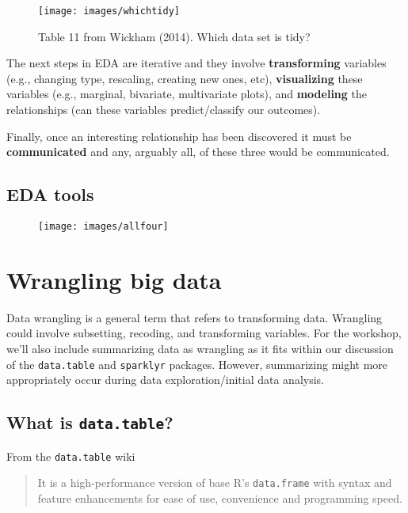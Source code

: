 \documentclass[
]{book}
\begin{document}
\begin{figure}
\texttt{[image: images/whichtidy]} \caption{Table 11 from Wickham (2014). Which data set is tidy?}\label{fig:tidypic}
\end{figure}

The next steps in EDA are iterative and they involve \textbf{transforming} variables (e.g., changing type, rescaling, creating new ones, etc), \textbf{visualizing} these variables (e.g., marginal, bivariate, multivariate plots), and \textbf{modeling} the relationships (can these variables predict/classify our outcomes).

Finally, once an interesting relationship has been discovered it must be \textbf{communicated} and any, arguably all, of these three would be communicated.

\hypertarget{eda-tools}{%
\section{EDA tools}\label{eda-tools}}

\begin{figure}
\texttt{[image: images/allfour]} \end{figure}

\hypertarget{wrangling-big-data}{%
\chapter{Wrangling big data}\label{wrangling-big-data}}

Data wrangling is a general term that refers to transforming data. Wrangling could involve subsetting, recoding, and transforming variables. For the workshop, we'll also include summarizing data as wrangling as it fits within our discussion of the \texttt{data.table} and \texttt{sparklyr} packages. However, summarizing might more appropriately occur during data exploration/initial data analysis.

\hypertarget{what-is-data.table}{%
\section{\texorpdfstring{What is \texttt{data.table}?}{What is data.table?}}\label{what-is-data.table}}

From the \texttt{data.table} wiki

\begin{quote}
It is a high-performance version of base R's \texttt{data.frame} with syntax and feature enhancements for ease of use, convenience and programming speed.
\end{quote}
\end{document}
